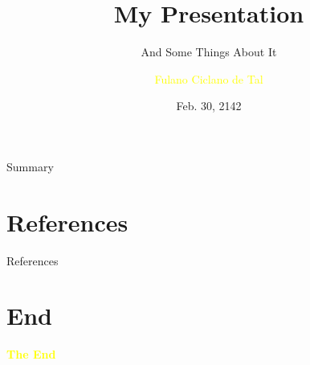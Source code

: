 \documentclass[aspectratio=43]{beamer}
\title{My Presentation} %
\subtitle{And Some Things About It}
\author[F.de Tal]{\textcolor{yellow}{Fulano Ciclano de Tal}}
\institute[IMUFSP]{
    \textcolor{white}{Institute of Mathematics}%
    \\%
    \textcolor{white}{Federal University of Some Place}%
} %
\date{Feb. 30, 2142}
\begin{document}
    
    \frame{\titlepage}
    
    \begin{frame}{Summary}
        \tableofcontents
    \end{frame}
    
    
    
    
    
     
    
        
    
    \section*{References} %
    \nocite{Djairo} \nocite{PhilPanof} \nocite{Fleming} \nocite{Shankar}
    \begin{frame}{References}
        \printbibliography
    \end{frame}

    \section{End}
    \begin{frame}{}
        \centering
            \Huge\bfseries
        \textcolor{yellow}{The End}
    \end{frame}
\end{document}
